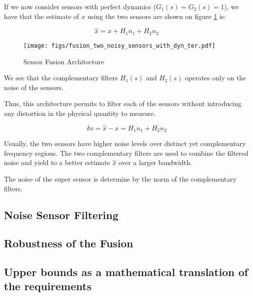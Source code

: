 \documentclass[9pt, technote, a4paper]{ieeeconf}
\begin{document}
If we now consider sensors with perfect dynamics (\(G_1(s) = G_2(s) = 1\)), we have that the estimate of \(x\) using the two sensors are shown on figure \ref{fig:fusion_two_noisy_sensors_with_dyn_ter} is:

\begin{equation}
  \hat{x} = x + H_1 n_1 + H_2 n_2
\end{equation}

\begin{figure}[htbp]
\centering
\texttt{[image: figs/fusion\_two\_noisy\_sensors\_with\_dyn\_ter.pdf]}
\caption{\label{fig:fusion_two_noisy_sensors_with_dyn_ter}
Sensor Fusion Architecture}
\end{figure}

We see that the complementary filters \(H_1(s)\) and \(H_2(s)\) operates only on the noise of the sensors.

Thus, this architecture permits to filter each of the sensors without introducing any distortion in the physical quantity to measure.

\begin{equation}
  \delta x = \hat{x} - x = H_1 n_1 + H_2 n_2
\end{equation}

Usually, the two sensors have higher noise levels over distinct yet complementary frequency regions. The two complementary filters are used to combine the filtered noise and yield to a better estimate \(\hat{x}\) over a larger bandwidth.

The noise of the super sensor is determine by the norm of the complementary filters.

\subsection{Noise Sensor Filtering}
\label{sec:org61f1e42}
\label{sec:noise_filtering}

\subsection{Robustness of the Fusion}
\label{sec:org88c9440}
\label{sec:fusion_robustness}

\subsection{Upper bounds as a mathematical translation of the requirements}
\label{sec:org2e8321f}
\label{sec:requirements_upper_bounds}
\end{document}
